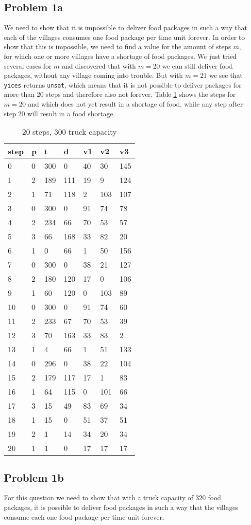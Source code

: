 \documentclass[a4paper]{article}
\begin{document}
	\subsection*{Problem 1a}
	We need to show that it is impossible to deliver food packages in such a way that each of the villages consumes one food package per time unit forever. In order to show that this is impossible, we need to find a value for the amount of steps $m$, for which one or more villages have a shortage of food packages. We just tried several cases for $m$ and discovered that with $m=20$ we can still deliver food packages, without any village coming into trouble. But with $m=21$ we see that \texttt{yices} returns \texttt{unsat}, which means that it is not possible to deliver packages for more than 20 steps and therefore also not forever. Table \ref{tab:1a} shows the steps for $m=20$ and which does not yet result in a shortage of food, while any step after step 20 will result in a food shortage.
	\begin{table}[!htb]
		\begin{longtable}[c]{@{}|l|l|l|l|l|l|l|@{}}
			\toprule
			step & p & t & d & v1 & v2 & v3\tabularnewline
			\midrule
			\endhead
			0 & 0 & 300 & 0 & 40 & 30 & 145\tabularnewline
			1 & 2 & 189 & 111 & 19 & 9 & 124\tabularnewline
			2 & 1 & 71 & 118 & 2 & 103 & 107\tabularnewline
			3 & 0 & 300 & 0 & 91 & 74 & 78\tabularnewline
			4 & 2 & 234 & 66 & 70 & 53 & 57\tabularnewline
			5 & 3 & 66 & 168 & 33 & 82 & 20\tabularnewline
			6 & 1 & 0 & 66 & 1 & 50 & 156\tabularnewline
			7 & 0 & 300 & 0 & 38 & 21 & 127\tabularnewline
			8 & 2 & 180 & 120 & 17 & 0 & 106\tabularnewline
			9 & 1 & 60 & 120 & 0 & 103 & 89\tabularnewline
			10 & 0 & 300 & 0 & 91 & 74 & 60\tabularnewline
			11 & 2 & 233 & 67 & 70 & 53 & 39\tabularnewline
			12 & 3 & 70 & 163 & 33 & 83 & 2\tabularnewline
			13 & 1 & 4 & 66 & 1 & 51 & 133\tabularnewline
			14 & 0 & 296 & 0 & 38 & 22 & 104\tabularnewline
			15 & 2 & 179 & 117 & 17 & 1 & 83\tabularnewline
			16 & 1 & 64 & 115 & 0 & 101 & 66\tabularnewline
			17 & 3 & 15 & 49 & 83 & 69 & 34\tabularnewline
			18 & 1 & 15 & 0 & 51 & 37 & 51\tabularnewline
			19 & 2 & 1 & 14 & 34 & 20 & 34\tabularnewline
			20 & 1 & 1 & 0 & 17 & 17 & 17\tabularnewline
			\bottomrule
		\end{longtable}
		\caption{20 steps, 300 truck capacity}
		\label{tab:1a}
	\end{table}
		
	\subsection*{Problem 1b}
	For this question we need to show that with a truck capacity of 320 food packages, it is possible to deliver food packages in such a way that the villages consume each one food package per time unit forever.
	
\end{document}
